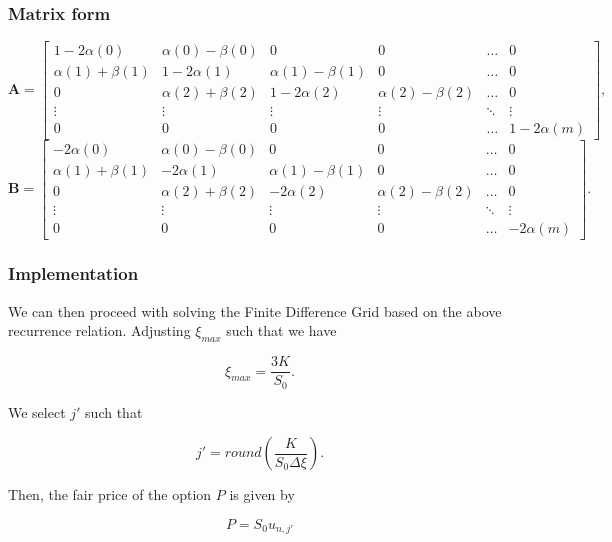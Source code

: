 \documentclass{beamer}
\begin{document}
  \begin{frame}
    \frametitle{Matrix form}
    \tiny
    \begin{equation}
      \textbf{A} = \begin{bmatrix}
        1-2\alpha(0) & \alpha(0) - \beta(0) & 0 & 0 & \hdots & 0 \\
        \alpha(1) + \beta(1) & 1-2\alpha(1) & \alpha(1) - \beta(1) & 0 & \hdots & 0 \\
        0 & \alpha(2) + \beta(2) & 1-2\alpha(2) & \alpha(2) - \beta(2) & \hdots & 0 \\
        \vdots & \vdots & \vdots & \vdots & \ddots & \vdots \\
        0 & 0 & 0 & 0 & \hdots & 1-2\alpha(m)
      \end{bmatrix},
    \end{equation}
    \begin{equation}
      \textbf{B} = \begin{bmatrix}
        -2\alpha(0) & \alpha(0) - \beta(0) & 0 & 0 & \hdots & 0 \\
        \alpha(1) + \beta(1) & -2\alpha(1) & \alpha(1) - \beta(1) & 0 & \hdots & 0 \\
        0 & \alpha(2) + \beta(2) & -2\alpha(2) & \alpha(2) - \beta(2) & \hdots & 0 \\
        \vdots & \vdots & \vdots & \vdots & \ddots & \vdots \\
        0 & 0 & 0 & 0 & \hdots & -2\alpha(m)
      \end{bmatrix}.
    \end{equation}
  \end{frame}

  \begin{frame}
    \frametitle{Implementation}
    We can then proceed with solving the Finite Difference Grid based on the above recurrence relation. Adjusting \(\xi_{max}\) such that we have

    \begin{equation}
      \xi_{max} = \frac{3K}{S_0}.
    \end{equation}

    We select \(j'\) such that

    \begin{equation}
      j' = round(\frac{K}{S_0\Delta\xi}).
    \end{equation}

    Then, the fair price of the option \(P\) is given by

    \begin{equation}
      P = S_0 u_{n, j'}
    \end{equation}
  \end{frame}
\end{document}
